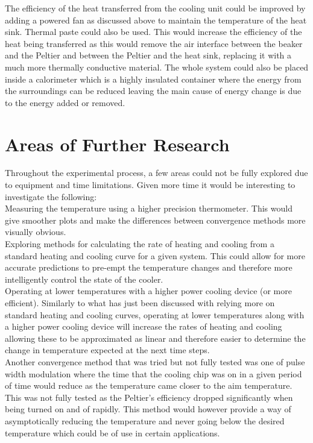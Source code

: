 \documentclass[10pt]{article}
\begin{document}
The efficiency of the heat transferred from the cooling unit could be improved by adding a powered fan as discussed above to maintain the temperature of the heat sink. Thermal paste \cite{paste} could also be used. This would increase the efficiency of the heat being transferred as this would remove the air interface between the beaker and the Peltier and between the Peltier and the heat sink, replacing it with a much more thermally conductive material. The whole system could also be placed inside a calorimeter \cite{calorimeter} which is a highly insulated container where the energy from the surroundings can be reduced leaving the main cause of energy change is due to the energy added or removed.\\

\section*{Areas of Further Research}
Throughout the experimental process, a few areas could not be fully explored due to equipment and time limitations. Given more time it would be interesting to investigate the following: \\

Measuring the temperature using a higher precision thermometer. This would give smoother plots and make the differences between convergence methods more visually obvious.\\

Exploring methods for calculating the rate of heating and cooling from a standard heating and cooling curve for a given system. This could allow for more accurate predictions to pre-empt the temperature changes and therefore more intelligently control the state of the cooler. \\

Operating at lower temperatures with a higher power cooling device (or more efficient). Similarly to what has just been discussed with relying more on standard heating and cooling curves, operating at lower temperatures along with a higher power cooling device will increase the rates of heating and cooling allowing these to be approximated as linear and therefore easier to determine the change in temperature expected at the next time steps.\\

Another convergence method that was tried but not fully tested was one of pulse width modulation where the time that the cooling chip was on in a given period of time would reduce as the temperature came closer to the aim temperature. This was not fully tested as the Peltier's efficiency dropped significantly when being turned on and of rapidly. This method would however provide a way of asymptotically reducing the temperature and never going below the desired temperature which could be of use in certain applications.
\end{document}
